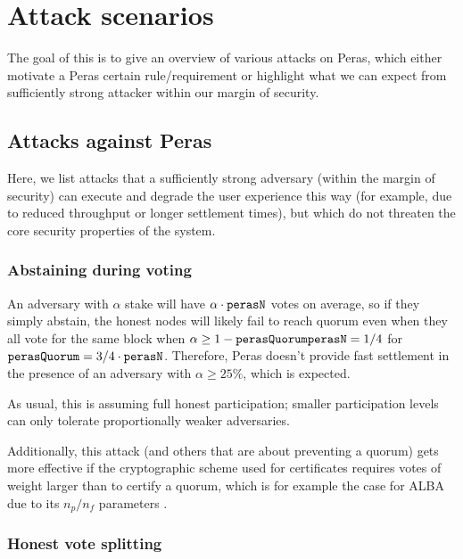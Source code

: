 \chapter{Attack scenarios}\label{chap:attack scenarios}

The goal of this  is to give an overview of various attacks on Peras, which either motivate a Peras certain rule/requirement or highlight what we can expect from sufficiently strong attacker within our margin of security.

\section{Attacks against Peras}

Here, we list attacks that a sufficiently strong adversary (within the margin of security) can execute and degrade the user experience this way (for example, due to reduced throughput or longer settlement times), but which do not threaten the core security properties of the system.

\subsection{Abstaining during voting}\label{sec:abstaining during voting}

An adversary with $\alpha$ stake will have $\alpha\cdot\mathtt{perasN}$ votes on average, so if they simply abstain, the honest nodes will likely fail to reach quorum even when they all vote for the same block when $\alpha \ge 1-\mathtt{perasQuorum}\mathtt{perasN} = 1/4$ for $\mathtt{perasQuorum} = 3/4 \cdot \mathtt{perasN}$.
Therefore, Peras doesn't provide fast settlement in the presence of an adversary with $\alpha\ge 25\%$, which is expected.

As usual, this is assuming full honest participation; smaller participation levels can only tolerate proportionally weaker adversaries.

Additionally, this attack (and others that are about preventing a quorum) gets more effective if the cryptographic scheme used for certificates requires votes of weight larger than \perasQuorum{} to certify a quorum, which is for example the case for ALBA due to its $n_p/n_f$ parameters \parencite{chaidos2024approximate}.

\subsection{Honest vote splitting}\label{sec:honest vote splitting}

